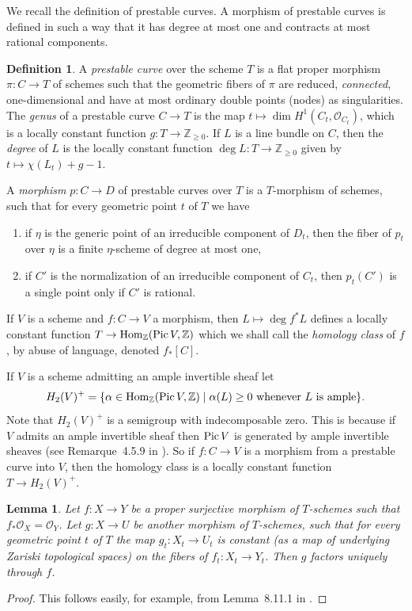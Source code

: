 \documentclass[11pt]{amsart}
\newtheorem{lem}[prop]{Lemma}
\theoremstyle{definition}
\newtheorem{defn}[prop]{Definition}
\theoremstyle{remark}
\newenvironment{pf}{\begin{proof}}{\end{proof}}
\newcommand{\upst}{^{\ast}}
\newcommand{\lst}{_{\ast}}
\newcommand{\zz}{{\mathbb{Z}}}
\renewcommand{\O}{{\mathcal{O}}}
\renewcommand{\st}{\mathrel{\mid}}
\newcommand{\Hom}{\operatorname{\rm Hom}\nolimits}
\newcommand{\Pic}{\operatorname{\rm Pic}\nolimits}
\theoremstyle{plain}
\theoremstyle{definition}
\theoremstyle{remark}
\begin{document}
We recall the definition of prestable curves. A morphism of prestable curves is
defined in such a way that it has degree
at most one and contracts at most rational components.

\begin{defn} \label{dopsc}
A {\em prestable curve }over the scheme \(T\) is a flat proper morphism
\(\pi:C\rightarrow T\) of schemes such that the
geometric fibers of \(\pi\) are reduced, {\em connected}, one-dimensional and
have at most ordinary double points (nodes)
as singularities.  The {\em genus } of a prestable curve \(C\rightarrow T\) is
the map \(t\mapsto\dim H^1(C_t,\O_{C_t})\),
which is a locally constant function \(g:T\rightarrow\zz_{\geq0}\). If \(L\) is a
line bundle on \(C\), then the {\em degree }
of \(L\) is the locally constant function \(\deg L:T\rightarrow\zz_{\geq0}\) given
by \(t\mapsto\chi(L_t)+g-1\).

A {\em morphism }\(p:C\rightarrow D\) of prestable curves over \(T\) is a
\(T\)-morphism of schemes, such that for every
geometric point \(t\) of \(T\) we have
\begin{enumerate}
\item if \(\eta\) is the generic point of an irreducible component of \(D_t\), then
the fiber of \(p_t\) over \(\eta\) is a finite
\(\eta\)-scheme of degree at most one,
\item if \(C'\) is the normalization of an irreducible component of \(C_t\), then
\(p_t(C')\) is a single point only if \(C'\)
is rational.
\end{enumerate}
\end{defn}

If \(V\) is a scheme and \(f:C\rightarrow V\) a morphism, then \(L\mapsto\deg f\upst
L\) defines a locally constant function
\(T\rightarrow\Hom_\zz(\Pic V,\zz)\) which we shall call the {\em homology class
} of \(f\), by abuse of language, denoted
\(f\lst[C]\).

If \(V\) is a scheme admitting an ample invertible sheaf let
\[
H_2(V)^+=\{\alpha\in\Hom_\zz(\Pic V,\zz)\st \text{\(\alpha(L)\geq0\) whenever
\(L\) is ample}\}.
\]
Note that \(H_2(V)^+\) is a semigroup with indecomposable zero. This is because
if \(V\) admits an ample invertible sheaf
then \(\Pic V\) is generated by ample invertible sheaves (see Remarque~4.5.9 in
\cite{ega2}). So if \(f:C\rightarrow V\) is
a morphism from a prestable curve into \(V\), then the homology class is a
locally constant function \(T\rightarrow
H_2(V)^+\).

\begin{lem} \label{tloq}
Let \(f:X\rightarrow Y\) be a proper surjective morphism of \(T\)-schemes such that
\(f\lst\O_X=\O_Y\). Let \(g:X\rightarrow U\)
be another morphism of \(T\)-schemes, such that for every geometric point \(t\) of
\(T\) the map \(g_t:X_t\rightarrow U_t\) is
constant (as a map of underlying Zariski topological spaces) on the fibers of
\(f_t:X_t\rightarrow Y_t\). Then \(g\) factors
uniquely through \(f\).
\end{lem}
\begin{pf}
This follows easily, for example, from Lemma~8.11.1 in \cite{ega2}.
\end{pf}
\end{document}
